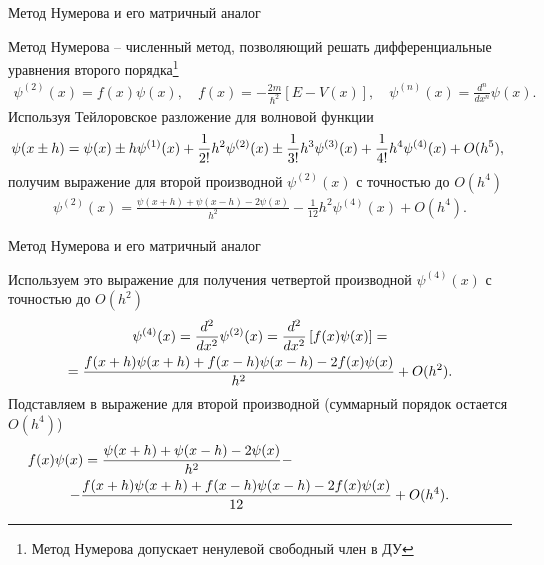 \documentclass[10pt,pdf,hyperref={unicode},xcolor=dvipsnames]{beamer}
\newcommand{\lsq}{\left[}
\newcommand{\rsq}{\right]}
\newcommand{\psip}[1]{\psi^{(#1)}(x)}
\newcommand{\fx}[0]{f(x)}
\newcommand{\psix}[0]{\psi(x)}
\begin{document}
\begin{frame}{Метод Нумерова и его матричный аналог}
    \begin{block}{}
        Метод Нумерова -- численный метод, позволяющий решать дифференциальные уравнения второго порядка\footnote{Метод Нумерова допускает ненулевой свободный член в ДУ}
        \begin{gather}
            \psip{2} = f(x) \psi(x), \quad f(x) = -\frac{2 m}{\hbar^2}\lsq E - V(x) \rsq, \quad \psip{n} = \frac{d^n}{dx^n} \psi(x).
        \end{gather}
        Используя Тейлоровское разложение для волновой функции
        \begin{gather}
            \hspace*{-0.1cm}
            \psi(x \pm h) = \psi(x) \pm h \psip{1} + \frac{1}{2!} h^2 \psip{2} \pm \frac{1}{3!} h^3 \psip{3} + \frac{1}{4!} h^4 \psip{4} + O(h^5), \notag
        \end{gather}
        получим выражение для второй производной $\psip{2}$ с точностью до $O(h^4)$
        \begin{gather}
            \psip{2} = \frac{ \psi(x+h) + \psi(x-h) - 2\psi(x) }{ h^2 } - \frac{1}{12} h^2 \psip{4} + O ( h^4 ).
        \end{gather}
    \end{block}
\end{frame}

\begin{frame}{Метод Нумерова и его матричный аналог}
    \begin{block}{}
        Используем это выражение для получения четвертой производной $\psip{4}$ с точностью до $O(h^2)$
        \begin{gather}
            \psip{4} = \frac{d^2}{dx^2} \psip{2} = \frac{d^2}{dx^2} \lsq \fx \psix \rsq = \notag \\
                     = \frac{ f(x+h)\psi(x+h) + f(x-h)\psi(x-h) - 2f(x)\psi(x) }{ h^2 } + O(h^2). 
        \end{gather}
        Подставляем в выражение для второй производной (суммарный порядок остается $O(h^4)$)
        \begin{gather}
            \fx \psix = \frac{\psi(x+h)+\psi(x-h)-2\psi(x)}{h^2} - \hspace{5cm} \notag \\ 
            - \frac{f(x+h) \psi(x+h) + f(x-h) \psi(x-h) - 2f(x) \psi(x)}{12} + O(h^4).
        \end{gather}
    \end{block}
\end{frame}
\end{document}
